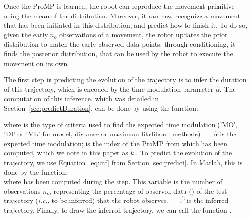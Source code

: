 \documentclass[utf8]{frontiersSCNS} %
\newcommand{\rev}[1]{\textcolor{blue}{#1}}
\begin{document}
Once the ProMP is learned, the robot can reproduce the movement primitive using the mean of the distribution.
Moreover, it can now recognize a movement that has been initiated in this distribution, and predict how to finish it. To do so, given the early $n_{o}$ observations of a movement, the robot updates the prior distribution to match the early observed data points: through conditioning, it finds the posterior distribution, that can be used by the robot to execute the movement on its own.

The first step in predicting the evolution of the trajectory is to infer the duration of this trajectory, which is encoded by the time modulation parameter $\hat{\alpha}$. The computation of this inference, which was detailed in Section~\ref{sec:predictDuration}, can be done by using the function:


where  is the type of criteria used to find the expected time modulation ('MO', 'DI' or 'ML' for model, distance or maximum likelihood methods);  $=\hat{\alpha}$ is the expected time modulation;  is the index of the ProMP from which  has been computed, which we note in this paper as $k$ .
To predict the evolution of the trajectory, we use Equation~\ref{eq:inf} from Section \ref{sec:predict}. In Matlab, this is done by the function:
\\
where  has been computed during the  step. This variable is the number of observations $n_o$, representing the percentage of observed data () of the test trajectory (\textit{i.e.}, to be inferred) that the robot observes. $= \hat{\Xi}$ is the inferred trajectory.
Finally, to draw the inferred trajectory, we can call the function  .
\end{document}
